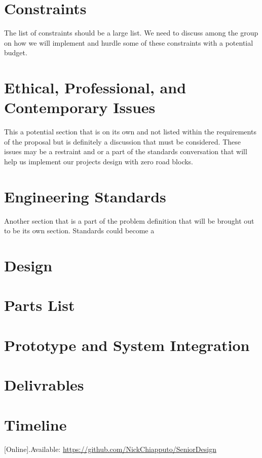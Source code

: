 \documentclass[conference]{IEEEtran}
\begin{document}
	\section{Constraints}
		The list of constraints should be a large list. We need to discuss among the group on how we will implement and hurdle some of these constraints with a potential budget.

	\section{Ethical, Professional, and Contemporary Issues}
		This a potential section that is on its own and not listed within the requirements of the proposal but is definitely a discussion that must be considered. These issues may be a restraint and or a part of the standards conversation that will help us implement our projects design with zero road blocks.

	\section{Engineering Standards}
		Another section that is a part of the problem definition that will be brought out to be its own section. Standards could become a 

	\section{Design}


	\section{Parts List}


	\section{Prototype and System Integration}


	\section{Delivrables}


	\section{Timeline}


	\begin{thebibliography}{00}
		 [Online].Available: \url{https://github.com/NickChiapputo/SeniorDesign}
	\end{thebibliography}
\end{document}
